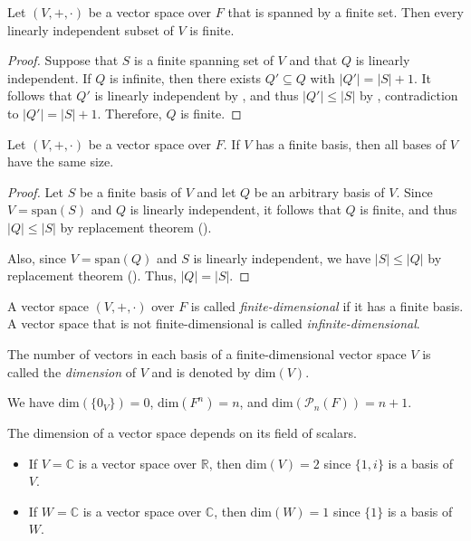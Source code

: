 \begin{corollary}
  Let $(V, +, \cdot)$ be a vector space over $F$ that is spanned by a finite
  set. Then every linearly independent subset of $V$ is finite.
\end{corollary}
\begin{proof}
  Suppose that $S$ is a finite spanning set of $V$ and that $Q$ is linearly
  independent.
  If $Q$ is infinite, then there exists $Q' \subseteq Q$ with
  $|Q'| = |S| + 1$.
  It follows that $Q'$ is linearly independent by
  , and thus $|Q'| \leq |S|$ by
  , contradiction to $|Q'| = |S| + 1$.
  Therefore, $Q$ is finite.
\end{proof}

\begin{theorem}\label{thm:dimension}
  Let $(V, +, \cdot)$ be a vector space over $F$.
  If $V$ has a finite basis, then all bases of $V$ have the same size.
\end{theorem}
\begin{proof}
  Let $S$ be a finite basis of $V$ and let $Q$ be an arbitrary basis of $V$.
  Since $V = \mathrm{span}(S)$ and $Q$ is linearly independent, it
  follows that $Q$ is finite, and thus $|Q| \leq |S|$ by
  replacement theorem ().

  Also, since $V = \mathrm{span}(Q)$ and $S$ is linearly independent,
  we have $|S| \leq |Q|$ by replacement theorem ().
  Thus, $|Q| = |S|$.
\end{proof}

\begin{definition}
  A vector space $(V, +, \cdot)$ over $F$ is called \emph{finite-dimensional}
  if it has a finite basis.
  A vector space that is not finite-dimensional is called
  \emph{infinite-dimensional}.
\end{definition}

\begin{definition}
  The number of vectors in each basis of a finite-dimensional vector space $V$
  is called the \emph{dimension} of $V$ and is denoted by $\mathrm{dim}(V)$.
\end{definition}

\begin{example}
  We have $\mathrm{dim}(\{0_V\}) = 0$, $\mathrm{dim}(F^n) = n$, and
  $\mathrm{dim}(\mathcal{P}_n(F)) = n + 1$.
\end{example}

\begin{example}
  The dimension of a vector space depends on its field of scalars.
  \begin{itemize}
    \item If $V = \mathbb{C}$ is a vector space over $\mathbb{R}$, then
      $\mathrm{dim}(V) = 2$ since $\{1, i\}$ is a basis of $V$.
    \item If $W = \mathbb{C}$ is a vector space over $\mathbb{C}$, then
      $\mathrm{dim}(W) = 1$ since $\{1\}$ is a basis of $W$.
  \end{itemize}
\end{example}

